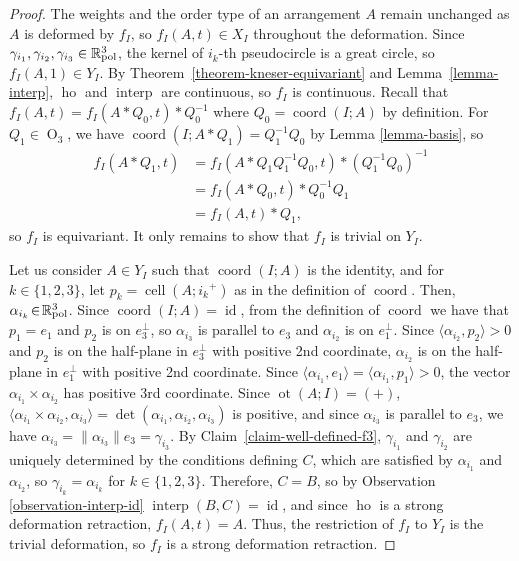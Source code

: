 \documentclass[11pt]{article}
\numberwithin{equation}{section}
\theoremstyle{remark}
\let\mb\mathbb
\DeclareMathOperator{\orth}{O}
\DeclareMathOperator{\cell}{cell}
\newcommand{\Rpol}[1]{\mb{R}\mathrlap{{}^{#1}}{}_\text{pol}}
\DeclareMathOperator{\interp}{interp}
\DeclareMathOperator{\coord}{coord}
\DeclareMathOperator{\ho}{ho}
\DeclareMathOperator{\id}{id}
\DeclareMathOperator{\ot}{ot}
\begin{document}
\begin{proof}
The weights and the order type of an arrangement $A$ remain unchanged as $A$ is deformed by $f_I$, so $f_I(A,t) \in X_I$ throughout the deformation.
Since $\gamma_{i_1},\gamma_{i_2},\gamma_{i_3} \in \Rpol{3}$, the kernel of $i_k$-th pseudocircle is a great circle, so $f_I(A,1) \in Y_I$. By Theorem~\ref{theorem-kneser-equivariant} and Lemma~\ref{lemma-interp}, $\ho$ and $\interp$ are continuous, so $f_I$ is continuous.
Recall that $f_I(A,t) = f_I(A*Q_0,t)*Q_0^{-1}$ where $Q_0 = \coord(I;A)$ by definition.
For $Q_1 \in \orth_3$,
we have ${\coord(I;A*Q_1) = Q_1^{-1}Q_0}$ by Lemma \ref{lemma-basis}, so
\begin{align*}
f_I(A*Q_1,t) & = f_I(A*Q_1Q_1^{-1}Q_0,t)*(Q_1^{-1}Q_0)^{-1} \\
& = f_I(A*Q_0,t)*Q_0^{-1}Q_1 \\
& = f_I(A,t)*Q_1,
\end{align*}
so $f_I$ is equivariant.
It only remains to show that $f_I$ is trivial on $Y_I$.

Let us consider $A\!\in\!Y_I$ such that $\coord(I;A)$ is the identity,
and for $k\!\in\!\{1,2,3\}$, let $p_k\!=\!\cell(A;{i_k}^+)$ as in the definition of $\coord$.
Then, $\alpha_{i_k}\!\in\!\Rpol{3}$. Since \hbox{$\coord(I;A)\!=\!\id$}, from the definition of $\coord$ we have that $p_1 = e_1$ and $p_2$ is on $e_3^\bot$, so $\alpha_{i_3}$ is parallel to $e_3$ and $\alpha_{i_2}$ is on $e_1^\bot$.
Since $\langle \alpha_{i_2},p_2 \rangle > 0$ and $p_2$ is on the half-plane in $e_3^\bot$ with positive 2nd coordinate, $\alpha_{i_2}$ is on the half-plane in $e_1^\bot$ with positive 2nd coordinate.
Since $\langle \alpha_{i_1},e_1 \rangle = \langle \alpha_{i_1},p_1 \rangle > 0$,
the vector $\alpha_{i_1} \times \alpha_{i_2}$ has positive 3rd coordinate.
Since $\ot(A;I) = (+)$,
$\langle \alpha_{i_1} \times \alpha_{i_2}, \alpha_{i_3} \rangle = \det(\alpha_{i_1},\alpha_{i_2},\alpha_{i_3})$ is positive, and since $\alpha_{i_3}$ is parallel to $e_3$, we have $\alpha_{i_3} = \|\alpha_{i_3}\|e_3 = \gamma_{i_3}$.
By Claim~\ref{claim-well-defined-f3}, $\gamma_{i_1}$ and $\gamma_{i_2}$ are uniquely determined by the conditions defining $C$, which are satisfied by $\alpha_{i_1}$ and $\alpha_{i_2}$, so \hbox{$\gamma_{i_k} = \alpha_{i_k}$} for $k\in\{1,2,3\}$. Therefore, $C=B$, so by Observation \ref{observation-interp-id} $\interp(B,C) = \id$, and since $\ho$ is a strong deformation retraction, $f_I(A,t) = A$. Thus, the restriction of $f_I$ to $Y_I$ is the trivial deformation, so $f_I$ is a strong deformation retraction.
\end{proof}
\end{document}

